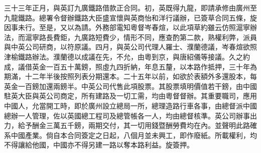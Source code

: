 \begin{pinyinscope}
三十三年正月，與英訂九廣鐵路借款正合同。初，英既得九龍，即請承修由廣州至九龍鐵路。總署令督辦鐵路大臣盛宣懷與英商怡和洋行議辦，已簽草合同五條，旋因事未行。至是，又以為請。外務部電知粵督岑春煊，以此項草約雖云仿照滬寧辦法，而滬寧路長費鉅，九廣路短費少，情形不同，應查酌第二款，熟權利弊，派員與中英公司研商，以符原議。四月，與英公司代理人羅士、濮蘭德議，岑春煊欲照津榆鐵路辦法。濮蘭德以成議在先，不允，由粵到京，與唐紹儀等接議。久之約成，議借英金一百五十萬鎊，照虛九四折納，年息五釐，以本路作抵押，三十年為期滿，十二年半後按照列表分期還本。二十五年以前，如欲於表額外多還股本，每英金一百鎊加還兩鎊半。中英公司代售此項股票。其股票填明價值若干鎊，由中國駐英大臣與英公司商定，所有建路及一切工需，均由粵督督辦。其重要職司，應用中國人，允當開工時，即於廣州設立總局一所，總理造路行車各事，由總督派中國總辦一人管理，佐以英國總工程司及總管帳各一人，均由總督核準。英公司辦事出力，給予酬金三萬五千鎊，兩期交付，其一切用錢暨酬勞費均在內。並聲明此路確系中國產業。倘自本合同簽定之日起，八個月並未興工，即作廢紙。所載權利，均不得讓給他國，中國亦不得另建一路以奪本路利益。旋簽押。


\end{pinyinscope}
